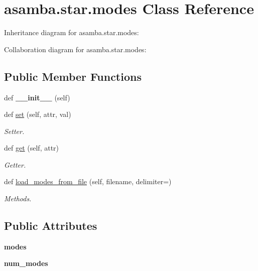 \hypertarget{classasamba_1_1star_1_1modes}{}\section{asamba.\+star.\+modes Class Reference}
\label{classasamba_1_1star_1_1modes}


Inheritance diagram for asamba.\+star.\+modes\+:


Collaboration diagram for asamba.\+star.\+modes\+:
\subsection*{Public Member Functions}
\begin{DoxyCompactItemize}
\item 
\mbox{\label{classasamba_1_1star_1_1modes_abce4d33b22e4f51db250c3e384591be6}} 
def {\bfseries \+\_\+\+\_\+init\+\_\+\+\_\+} (self)
\item 
\mbox{\label{classasamba_1_1star_1_1modes_a86f1dd21b0af24cc60d521fbeb391ef8}} 
def \hyperlink{classasamba_1_1star_1_1modes_a86f1dd21b0af24cc60d521fbeb391ef8}{set} (self, attr, val)
\begin{DoxyCompactList}\small\item\em Setter. \end{DoxyCompactList}\item 
\mbox{\label{classasamba_1_1star_1_1modes_a4bf25d680e466f4e888b3a63df76281d}} 
def \hyperlink{classasamba_1_1star_1_1modes_a4bf25d680e466f4e888b3a63df76281d}{get} (self, attr)
\begin{DoxyCompactList}\small\item\em Getter. \end{DoxyCompactList}\item 
def \hyperlink{classasamba_1_1star_1_1modes_a5164b765f3ed46300e4c5a1970f2c784}{load\+\_\+modes\+\_\+from\+\_\+file} (self, filename, delimiter=\textquotesingle{}\textquotesingle{})
\begin{DoxyCompactList}\small\item\em Methods. \end{DoxyCompactList}\end{DoxyCompactItemize}
\subsection*{Public Attributes}
\begin{DoxyCompactItemize}
\item 
\mbox{\label{classasamba_1_1star_1_1modes_a876e916c49eba64dc7cff4997a486000}} 
{\bfseries modes}
\item 
\mbox{\label{classasamba_1_1star_1_1modes_a2a36ba9c82cc7c23db125cfcdd2bf1d7}} 
{\bfseries num\+\_\+modes}
\end{DoxyCompactItemize}


